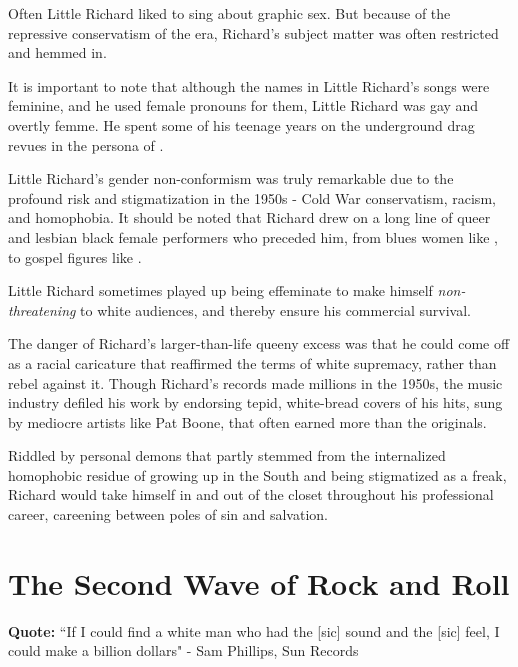 \documentclass[12pt, a4paper, twoside, openright, titlepage]{book}
\begin{document}
Often Little Richard liked to sing about graphic sex. But because of the repressive conservatism of the era, Richard's subject matter was often restricted and hemmed in.

It is important to note that although the names in Little Richard's songs were feminine, and he used female pronouns for them, Little Richard was gay and overtly femme. He spent some of his teenage years on the underground drag revues in the persona of .

\begin{note}{}{}
    Little Richard's gender non-conformism was truly remarkable due to the profound risk and stigmatization in the 1950s - Cold War conservatism, racism, and homophobia. It should be noted that Richard drew on a long line of queer and lesbian black female performers who preceded him, from blues women like , to gospel figures like .
\end{note}

Little Richard sometimes played up being effeminate to make himself \emph{non-threatening} to white audiences, and thereby ensure his commercial survival.


The danger of Richard's larger-than-life queeny excess was that he could come off as a racial caricature that reaffirmed the terms of white supremacy, rather than rebel against it. Though Richard's records made millions in the 1950s, the music industry defiled his work by endorsing tepid, white-bread covers of his hits, sung by mediocre artists like Pat Boone, that often earned more than the originals.



Riddled by personal demons that partly stemmed from the internalized homophobic residue of growing up in the South and being stigmatized as a freak, Richard would take himself in and out of the closet throughout his professional career, careening between poles of sin and salvation.




\chapter{The Second Wave of Rock and Roll}



\textbf{Quote:} ``If I could find a white man who had the [sic] sound and the [sic] feel, I could make a billion dollars" - Sam Phillips, Sun Records
\end{document}
